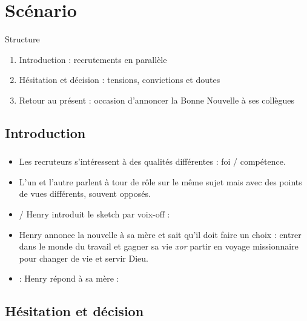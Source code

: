 \section{Scénario}

\begin{frame}
\sectionFrame{}
\end{frame}
	
\begin{frame}
	\begin{block}{Structure}
		\begin{enumerate}
		\item Introduction : recrutements en parallèle
		\item Hésitation et décision : tensions, convictions et doutes
		\item Retour au présent : occasion d'annoncer la Bonne Nouvelle
		à ses collègues
		\end{enumerate}
	\end{block}
\end{frame}

	\subsection{Introduction}
	
	\begin{frame}[allowframebreaks]
	\frametitle{\insertsubsection}

		\begin{itemize}
		\item \histoire{} Les recruteurs s'intéressent à des qualités 
		différentes : foi / compétence.
		\item \mes{} L'un et l'autre parlent à tour de rôle sur le même
		sujet mais avec des points de vues différents, souvent opposés.
		\item \mes{}/\histoire{} Henry introduit le sketch par voix-off : 
		\item \histoire{} Henry annonce la nouvelle à sa mère et sait qu'il doit
		faire un choix : entrer dans le monde du travail
		et gagner sa vie \emph{xor} partir en voyage missionnaire pour 
		changer de vie et servir Dieu.
		\item \humour{} : Henry répond à sa mère : 
		\end{itemize}
	
	\end{frame}
	
	\subsection{Hésitation et décision}
	
